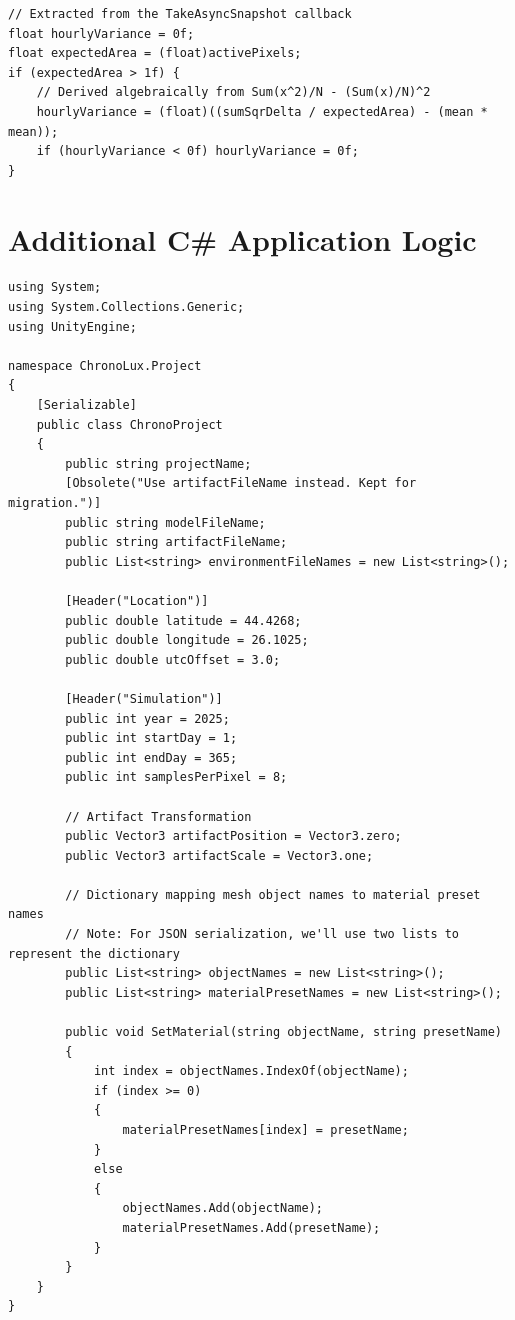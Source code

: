 \begin{lstlisting}[language={[Sharp]C}, caption={LightDoseSimulator.cs: Computes statistical variance across the accumulated dosimetric frame.}, label={lst:variance}]
// Extracted from the TakeAsyncSnapshot callback
float hourlyVariance = 0f;
float expectedArea = (float)activePixels;
if (expectedArea > 1f) {
    // Derived algebraically from Sum(x^2)/N - (Sum(x)/N)^2
    hourlyVariance = (float)((sumSqrDelta / expectedArea) - (mean * mean));
    if (hourlyVariance < 0f) hourlyVariance = 0f;
}
\end{lstlisting}

\section{Additional C\# Application Logic}
\label{apx:additional_csharp}

\begin{lstlisting}[language={[Sharp]C}, caption={ChronoProject.cs: Serialization model for project parameters.}, label={lst:chronoproject}]
using System;
using System.Collections.Generic;
using UnityEngine;

namespace ChronoLux.Project
{
    [Serializable]
    public class ChronoProject
    {
        public string projectName;
        [Obsolete("Use artifactFileName instead. Kept for migration.")]
        public string modelFileName; 
        public string artifactFileName;
        public List<string> environmentFileNames = new List<string>();
        
        [Header("Location")]
        public double latitude = 44.4268;
        public double longitude = 26.1025;
        public double utcOffset = 3.0;

        [Header("Simulation")]
        public int year = 2025;
        public int startDay = 1;
        public int endDay = 365;
        public int samplesPerPixel = 8;
        
        // Artifact Transformation
        public Vector3 artifactPosition = Vector3.zero;
        public Vector3 artifactScale = Vector3.one;
        
        // Dictionary mapping mesh object names to material preset names
        // Note: For JSON serialization, we'll use two lists to represent the dictionary
        public List<string> objectNames = new List<string>();
        public List<string> materialPresetNames = new List<string>();

        public void SetMaterial(string objectName, string presetName)
        {
            int index = objectNames.IndexOf(objectName);
            if (index >= 0)
            {
                materialPresetNames[index] = presetName;
            }
            else
            {
                objectNames.Add(objectName);
                materialPresetNames.Add(presetName);
            }
        }
    }
}
\end{lstlisting}

